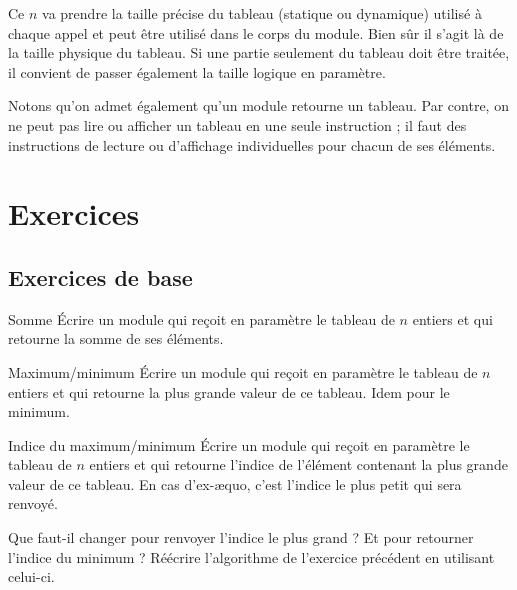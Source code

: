 	Ce $n$ va prendre la taille précise du tableau
	(statique ou dynamique) utilisé à chaque appel et peut être utilisé
	dans le corps du module. Bien sûr il s’agit là de la taille physique du
	tableau. Si une partie seulement du tableau doit être traitée, il
	convient de passer également la taille logique en paramètre.
	

	
	Notons qu’on admet également qu’un module retourne un tableau. Par
	contre, on ne peut pas lire ou afficher un tableau en une seule
	instruction ; il faut des instructions de lecture ou
	d'affichage individuelles pour chacun de ses éléments.

\section{Exercices}

\subsection{Exercices de base}

\begin{Exercice}{Somme}
	Écrire un module qui reçoit en paramètre le tableau
	 de $n$ entiers 
	et qui retourne la somme de ses éléments.
\end{Exercice}

\begin{Exercice}{Maximum/minimum}
	Écrire un module qui reçoit en paramètre le tableau
	 de $n$ entiers et qui
	retourne la plus grande valeur de ce tableau. Idem pour le minimum.
\end{Exercice}

\begin{Exercice}{Indice du maximum/minimum}
	\label{ex:indiceminmax}
	Écrire un module qui reçoit en paramètre le tableau
	 de $n$ entiers et qui
	retourne l’indice de l’élément contenant la plus grande valeur de ce
	tableau. 
	En cas d’ex-æquo, c’est l’indice le plus petit qui sera renvoyé.
	
	Que faut-il changer pour renvoyer l’indice le plus grand ?
	Et pour retourner l’indice du minimum ? 
	Réécrire l’algorithme de l’exercice précédent en utilisant celui-ci.
\end{Exercice}

